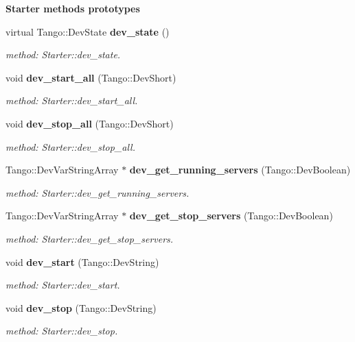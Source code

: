 \begin{Indent}{\bf Starter methods prototypes}\par
\begin{CompactItemize}
\item 
virtual Tango::Dev\-State {\bf dev\_\-state} ()
\begin{CompactList}\small\item\em method: Starter::dev\_\-state.\item\end{CompactList}\item 
void {\bf dev\_\-start\_\-all} (Tango::Dev\-Short)
\begin{CompactList}\small\item\em method: Starter::dev\_\-start\_\-all.\item\end{CompactList}\item 
void {\bf dev\_\-stop\_\-all} (Tango::Dev\-Short)
\begin{CompactList}\small\item\em method: Starter::dev\_\-stop\_\-all.\item\end{CompactList}\item 
Tango::Dev\-Var\-String\-Array $\ast$ {\bf dev\_\-get\_\-running\_\-servers} (Tango::Dev\-Boolean)
\begin{CompactList}\small\item\em method: Starter::dev\_\-get\_\-running\_\-servers.\item\end{CompactList}\item 
Tango::Dev\-Var\-String\-Array $\ast$ {\bf dev\_\-get\_\-stop\_\-servers} (Tango::Dev\-Boolean)
\begin{CompactList}\small\item\em method: Starter::dev\_\-get\_\-stop\_\-servers.\item\end{CompactList}\item 
void {\bf dev\_\-start} (Tango::Dev\-String)
\begin{CompactList}\small\item\em method: Starter::dev\_\-start.\item\end{CompactList}\item 
void {\bf dev\_\-stop} (Tango::Dev\-String)
\begin{CompactList}\small\item\em method: Starter::dev\_\-stop.\item\end{CompactList}\item 

\end{CompactItemize}
\end{Indent}
